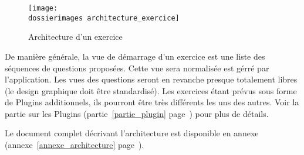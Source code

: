 \begin{figure}[htp]
	\centering
	\texttt{[image: \\dossierimages architecture\_exercice]}
	\caption{Architecture d'un exercice}
	\label{architecture_exercice}
\end{figure}

De manière générale, la vue de démarrage d’un exercice est une liste des séquences de questions proposées. Cette vue sera normalisée est gérré par l'application. Les vues des questions seront en revanche presque totalement libres (le design graphique doit être standardisé). Les exercices étant prévus sous forme de \og{}Plugins\fg{} additionnels, ils pourront \^{e}tre très différents les uns des autres. Voir la partie sur les Plugins (partie~\ref{partie_plugin} page~\pageref{partie_plugin}) pour plus de détails.

Le document complet décrivant l'architecture est disponible en annexe (annexe~\ref{annexe_architecture} page~\pageref{annexe_architecture}).